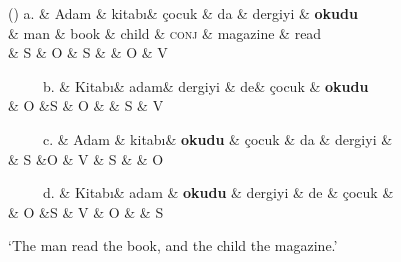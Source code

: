 \documentclass[11pt]{article}
\newenvironment{myquote}%
  {\list{}{\leftmargin=0.0in\rightmargin=0.0in}\item[]}%
  {\endlist}
\newcounter{excounter}
\begin{document}
\begin{myquote}
  \footnotesize
  \label{ex:tr-gap-1}
  \begin{dependency}[edge unit distance=2.5ex]
    \begin{deptext}
     (\theexcounter) a. \& Adam \& kitab\i \& \c{c}ocuk  \& da \& dergiyi \& \textbf{okudu} \\
     \& man  \& book \&  child \& \textsc{conj} \& magazine \& read \\
     \&  S \& O \& S \&  \& O \& V  \\
    \end{deptext}
  \end{dependency}
  
  \begin{dependency}[edge unit distance=2.5ex]
    \begin{deptext}[column sep=0.1cm]
     \ \ \ \ \ b. \& Kitab\i \&  adam\& dergiyi \& de\&  \c{c}ocuk  \& \textbf{okudu} \\
     \&  O \&S \& O \&  \& S \& V  \\
    \end{deptext}
  \end{dependency}
  
  \begin{dependency}
    \begin{deptext}[column sep=0.1cm]
      \ \ \ \ \ c. \& Adam \&  kitab\i  \& \textbf{okudu} \&  \c{c}ocuk  \&  da \& dergiyi \&   \\
     \&  S \&O \& V \& S \&  \& O  \\
    \end{deptext}
  \end{dependency}

  \begin{dependency}[edge unit distance=2.5ex]
    \begin{deptext}[column sep=0.1cm]
      \ \ \ \ \ d. \& Kitab\i   \& adam  \& \textbf{okudu} \& dergiyi   \&  de \& \c{c}ocuk  \&   \\
      \&  O \&S \& V \& O \&  \& S  \\
    \end{deptext}
  \end{dependency}
  \trans `The man read the book, and the child the magazine.'  \\ \null \hfill \cite{Bozsahin2000}
\end{myquote}
\end{document}
